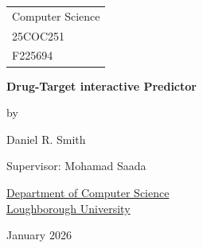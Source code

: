 \documentclass[a4paper]{report}
\begin{document}


\thispagestyle{empty}

\fancypage{}{}

\begin{center}

\Large{
\hfill \begin{tabular}{l}

Computer Science \\
25COC251 \\ 
F225694

\end{tabular}
}



\vspace*{\fill}

\Large{\textbf{Drug-Target interactive Predictor}}

\vspace*{\fill}

by

\vspace*{\fill}

Daniel R. Smith


\vspace*{\fill}
Supervisor: Mohamad Saada
\vspace*{\fill}

\underline{Department of Computer Science} \\
\underline{Loughborough University}

\vspace*{\fill}
January 2026

\end{center}

\tableofcontents
\newpage

 








\renewcommand\bibname{References}

\end{document}
